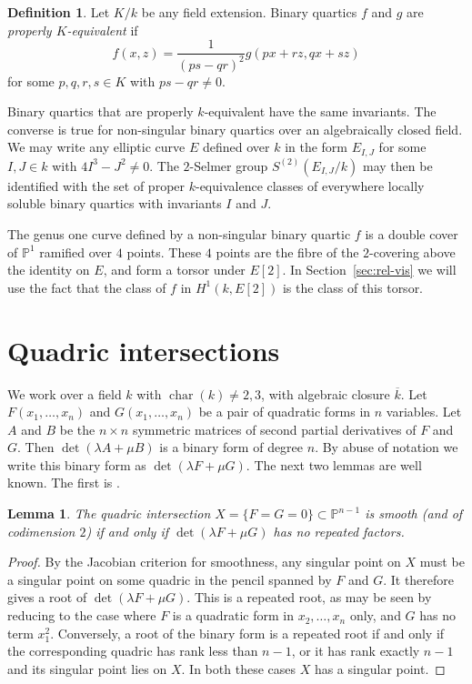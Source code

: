 \documentclass[12pt]{amsart}
\newcommand{\PP}{{\mathbb P}}
\newcommand{\kbar}{{\overline k}}
\newtheorem{Lemma}[Proposition]{Lemma}
\theoremstyle{definition}
\newtheorem{Definition}[Proposition]{Definition}
\begin{document}
\begin{Definition}
  Let $K/k$ be any field extension.  Binary quartics $f$ and $g$ are
  {\em properly $K$-equivalent} if
  \[ f(x,z) = \frac{1}{(p s - q r)^2} g (p x + r z, q x + s z) \]
  for some $p, q, r, s \in K$ with $p s - q r \not= 0$.
\end{Definition}

Binary quartics that are properly $k$-equivalent have the same
invariants. The converse is true for non-singular binary quartics over
an algebraically closed field.  We may write any elliptic curve $E$
defined over $k$ in the form $E_{I,J}$ for some $I,J \in k$ with
$4 I^3 - J^2 \not= 0$.  The $2$-Selmer group $S^{(2)}(E_{I,J}/k)$ may
then be identified with the set of proper $k$-equivalence classes of
everywhere locally soluble binary quartics with invariants $I$ and
$J$.

The genus one curve defined by a non-singular binary quartic $f$ is a
double cover of $\PP^1$ ramified over $4$ points.  These $4$ points
are the fibre of the $2$-covering above the identity on $E$,
and form a torsor under $E[2]$. In Section~\ref{sec:rel-vis} we will
use the fact that the class of $f$ in $H^1(k,E[2])$ is the class
of this torsor.

\section{Quadric intersections}
\label{sec:qi}

We work over a field $k$ with
$\operatorname{char}(k) \not= 2,3$, with algebraic closure $\kbar$.
Let $F(x_1, \ldots, x_n)$ and $G(x_1, \ldots, x_n)$ be a pair of
quadratic forms in $n$ variables. Let $A$ and $B$ be the $n \times n$
symmetric matrices of second partial derivatives of $F$ and $G$.  Then
$\det(\lambda A + \mu B)$ is a binary form of degree $n$.  By abuse of
notation we write this binary form as $\det(\lambda F + \mu G)$. The
next two lemmas are well known. The first is \cite[Proposition 2.1]{Reid}.

\begin{Lemma}
  \label{lem:qi-smooth}
  The quadric intersection $X = \{F = G = 0\} \subset \PP^{n-1}$ is
  smooth (and of codimension $2$) if and only if
  $\det(\lambda F + \mu G)$ has no repeated factors.
\end{Lemma}
\begin{proof}
  By the Jacobian criterion for smoothness, any singular point on $X$
  must be a singular point on some quadric in the pencil spanned by
  $F$ and $G$. It therefore gives a root of $\det(\lambda F + \mu G)$.
  This is a repeated root, as may be seen by reducing to the
  case where $F$ is a quadratic form in $x_2, \ldots, x_n$ only, and
  $G$ has no term $x_1^2$. Conversely, a root of the binary form is a
  repeated root if and only if the corresponding quadric has rank
  less than $n-1$, or it has rank exactly $n-1$ and its singular
  point lies on $X$. In both these cases $X$ has a singular point.
\end{proof}
\end{document}
